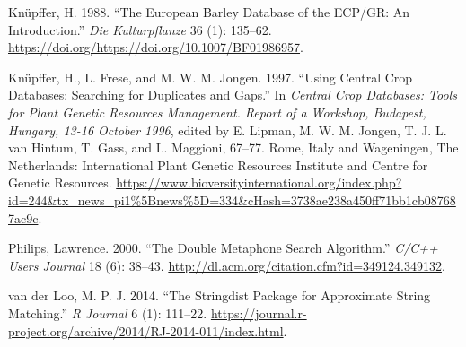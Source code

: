 \documentclass[]{article}
\begin{document}
\hypertarget{refs}{}
\leavevmode\hypertarget{ref-knupffer1988european}{}%
Knüpffer, H. 1988. ``The European Barley Database of the ECP/GR: An
Introduction.'' \emph{Die Kulturpflanze} 36 (1): 135--62.
\url{https://doi.org/https://doi.org/10.1007/BF01986957}.

\leavevmode\hypertarget{ref-kfj97}{}%
Knüpffer, H., L. Frese, and M. W. M. Jongen. 1997. ``Using Central Crop
Databases: Searching for Duplicates and Gaps.'' In \emph{Central Crop
Databases: Tools for Plant Genetic Resources Management. Report of a
Workshop, Budapest, Hungary, 13-16 October 1996}, edited by E. Lipman,
M. W. M. Jongen, T. J. L. van Hintum, T. Gass, and L. Maggioni, 67--77.
Rome, Italy and Wageningen, The Netherlands: International Plant Genetic
Resources Institute and Centre for Genetic Resources.
\url{https://www.bioversityinternational.org/index.php?id=244\&tx_news_pi1\%5Bnews\%5D=334\&cHash=3738ae238a450ff71bb1cb087687ac9c}.

\leavevmode\hypertarget{ref-p00}{}%
Philips, Lawrence. 2000. ``The Double Metaphone Search Algorithm.''
\emph{C/C++ Users Journal} 18 (6): 38--43.
\url{http://dl.acm.org/citation.cfm?id=349124.349132}.

\leavevmode\hypertarget{ref-van2014stringdist}{}%
van der Loo, M. P. J. 2014. ``The Stringdist Package for Approximate
String Matching.'' \emph{R Journal} 6 (1): 111--22.
\url{https://journal.r-project.org/archive/2014/RJ-2014-011/index.html}.
\end{document}
